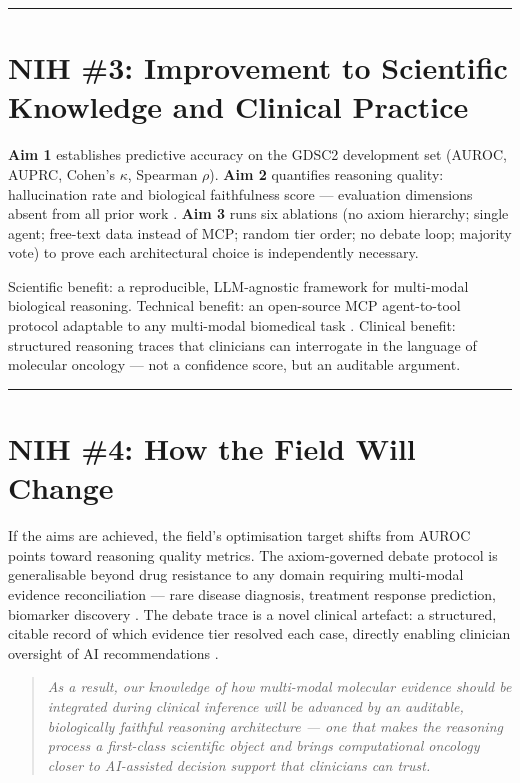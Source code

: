 \documentclass[12pt, letterpaper]{article}
\begin{document}
\hrule
\vspace{0.5em}

\section{NIH \#3: Improvement to Scientific Knowledge and Clinical Practice}

\textbf{Aim 1} establishes predictive accuracy on the GDSC2 development set (AUROC, AUPRC,
Cohen's $\kappa$, Spearman $\rho$). \textbf{Aim 2} quantifies reasoning quality: hallucination
rate and biological faithfulness score --- evaluation dimensions absent from all prior work
\cite{kim2025hallucination}. \textbf{Aim 3} runs six ablations (no axiom hierarchy; single agent;
free-text data instead of MCP; random tier order; no debate loop; majority vote) to prove each
architectural choice is independently necessary.

Scientific benefit: a reproducible, LLM-agnostic framework for multi-modal biological reasoning.
Technical benefit: an open-source MCP agent-to-tool protocol adaptable to any multi-modal
biomedical task \cite{mehandru2025bioagents}. Clinical benefit: structured reasoning traces that
clinicians can interrogate in the language of molecular oncology --- not a confidence score, but
an auditable argument.

\hrule
\vspace{0.5em}

\section{NIH \#4: How the Field Will Change}

If the aims are achieved, the field's optimisation target shifts from AUROC points toward reasoning
quality metrics. The axiom-governed debate protocol is generalisable beyond drug resistance to any
domain requiring multi-modal evidence reconciliation --- rare disease diagnosis, treatment response
prediction, biomarker discovery \cite{mehandru2025bioagents}. The debate trace is a novel clinical
artefact: a structured, citable record of which evidence tier resolved each case, directly enabling
clinician oversight of AI recommendations \cite{evomdt2026, han2024consensus}.

\begin{quote}
\small\textit{As a result, our knowledge of how multi-modal molecular evidence should be integrated
during clinical inference will be advanced by an auditable, biologically faithful reasoning
architecture --- one that makes the reasoning process a first-class scientific object and brings
computational oncology closer to AI-assisted decision support that clinicians can trust.}
\end{quote}
\end{document}
